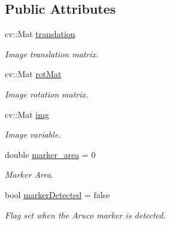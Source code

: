 \subsection*{Public Attributes}
\begin{DoxyCompactItemize}
\item 
cv\+::\+Mat \hyperlink{classTurtlebotPerception_ab2990c8e86ccebc227d88d409ab6331b}{translation}\hypertarget{classTurtlebotPerception_ab2990c8e86ccebc227d88d409ab6331b}{}\label{classTurtlebotPerception_ab2990c8e86ccebc227d88d409ab6331b}

\begin{DoxyCompactList}\small\item\em Image translation matrix. \end{DoxyCompactList}\item 
cv\+::\+Mat \hyperlink{classTurtlebotPerception_ad925de083f0e760e59f8c2e320bd6f38}{rot\+Mat}\hypertarget{classTurtlebotPerception_ad925de083f0e760e59f8c2e320bd6f38}{}\label{classTurtlebotPerception_ad925de083f0e760e59f8c2e320bd6f38}

\begin{DoxyCompactList}\small\item\em Image rotation matrix. \end{DoxyCompactList}\item 
cv\+::\+Mat \hyperlink{classTurtlebotPerception_ac97f85cc82d1f51a3ed3270d6c0d8325}{img}\hypertarget{classTurtlebotPerception_ac97f85cc82d1f51a3ed3270d6c0d8325}{}\label{classTurtlebotPerception_ac97f85cc82d1f51a3ed3270d6c0d8325}

\begin{DoxyCompactList}\small\item\em Image variable. \end{DoxyCompactList}\item 
double \hyperlink{classTurtlebotPerception_a175e02584b29cab5d6d6a3551ae51fb2}{marker\+\_\+area} = 0\hypertarget{classTurtlebotPerception_a175e02584b29cab5d6d6a3551ae51fb2}{}\label{classTurtlebotPerception_a175e02584b29cab5d6d6a3551ae51fb2}

\begin{DoxyCompactList}\small\item\em Marker Area. \end{DoxyCompactList}\item 
bool \hyperlink{classTurtlebotPerception_abf558ba5d1fb9c224029a9f3e8618a2c}{marker\+Detected} = false\hypertarget{classTurtlebotPerception_abf558ba5d1fb9c224029a9f3e8618a2c}{}\label{classTurtlebotPerception_abf558ba5d1fb9c224029a9f3e8618a2c}

\begin{DoxyCompactList}\small\item\em Flag set when the Aruco marker is detected. \end{DoxyCompactList}\end{DoxyCompactItemize}


